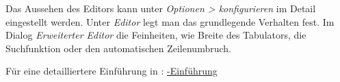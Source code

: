 Das Aussehen des Editors kann unter \textit{Optionen > \texstud konfigurieren}
im Detail eingestellt werden. Unter \textit{Editor} legt man das grundlegende Verhalten fest. Im Dialog \textit{Erweiterter Editor} die Feinheiten, wie Breite des Tabulators, die Suchfunktion oder den automatischen Zeilenumbruch.


%
Für eine detailliertere Einführung in \texstud : \href{http://www.mi.uni-koeln.de/wp-MIEDV/wp-content/uploads/2016/05/dokumentNeuYP.pdf}{{\color{blue}\texstud -Einführung}}